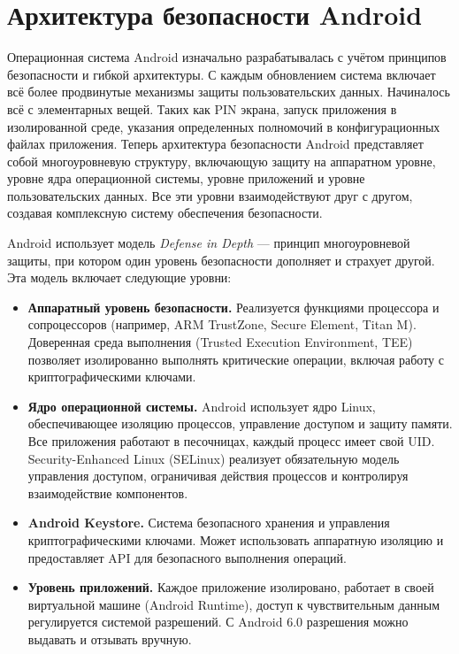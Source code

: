 \section{Архитектура безопасности Android}

Операционная система Android изначально разрабатывалась с учётом принципов
безопасности и гибкой архитектуры. С каждым обновлением система включает всё
более продвинутые механизмы защиты пользовательских данных. Начиналось всё с
элементарных вещей. Таких как PIN экрана, запуск приложения в изолированной
среде, указания определенных полномочий в конфигурационных файлах приложения.
Теперь архитектура безопасности Android представляет собой многоуровневую
структуру, включающую защиту на аппаратном уровне, уровне ядра операционной
системы, уровне приложений и уровне пользовательских данных. Все эти уровни
взаимодействуют друг с другом, создавая комплексную систему обеспечения
безопасности.

Android использует модель \textit{Defense in Depth} --- принцип многоуровневой
защиты, при котором один уровень безопасности дополняет и страхует другой. Эта
модель включает следующие уровни:

\begin{itemize}
    \item \textbf{Аппаратный уровень безопасности.} Реализуется функциями
    процессора и сопроцессоров (например, ARM TrustZone, Secure Element, Titan
    M). Доверенная среда выполнения (Trusted Execution Environment, TEE)
    позволяет изолированно выполнять критические операции, включая работу с
    криптографическими ключами.

    \item \textbf{Ядро операционной системы.} Android использует ядро Linux,
    обеспечивающее изоляцию процессов, управление доступом и защиту памяти. Все
    приложения работают в песочницах, каждый процесс имеет свой UID.
    Security-Enhanced Linux (SELinux) реализует обязательную модель управления
    доступом, ограничивая действия процессов и контролируя взаимодействие
    компонентов.

    \item \textbf{Android Keystore.} Система безопасного хранения и управления
    криптографическими ключами. Может использовать аппаратную изоляцию и
    предоставляет API для безопасного выполнения операций.

    \item \textbf{Уровень приложений.} Каждое приложение изолировано, работает
    в своей виртуальной машине (Android Runtime), доступ к чувствительным
    данным регулируется системой разрешений. С Android 6.0 разрешения можно
    выдавать и отзывать вручную.
\end{itemize}

